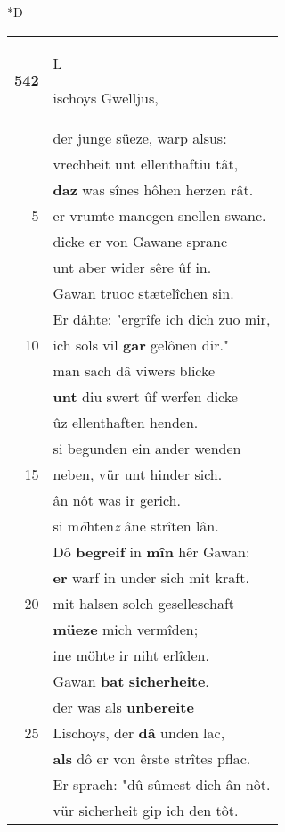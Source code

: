 \documentclass[8pt,a4paper,notitlepage]{article}
\begin{document}
\begin{table}[ht]
\begin{minipage}[t]{0.5\linewidth}
\small
\begin{center}*D
\end{center}
\begin{tabular}{rl}
\textbf{542} & \begin{large}L\end{large}ischoys Gwelljus,\\ 
 & der junge süeze, warp alsus:\\ 
 & vrechheit unt ellenthaftiu tât,\\ 
 & \textbf{daz} was sînes hôhen herzen rât.\\ 
5 & er vrumte manegen snellen swanc.\\ 
 & dicke er von Gawane spranc\\ 
 & unt aber wider sêre ûf in.\\ 
 & Gawan truoc stætelîchen sin.\\ 
 & Er dâhte: "ergrîfe ich dich zuo mir,\\ 
10 & ich sols vil \textbf{gar} gelônen dir."\\ 
 & man sach dâ viwers blicke\\ 
 & \textbf{unt} diu swert ûf werfen dicke\\ 
 & ûz ellenthaften henden.\\ 
 & si begunden ein ander wenden\\ 
15 & neben, vür unt hinder sich.\\ 
 & ân nôt was ir gerich.\\ 
 & si m\textit{ö}hten\textit{z} âne strîten lân.\\ 
 & Dô \textbf{begreif} in \textbf{mîn} hêr Gawan:\\ 
 & \textbf{er} warf in under sich mit kraft.\\ 
20 & mit halsen solch geselleschaft\\ 
 & \textbf{müeze} mich vermîden;\\ 
 & ine möhte ir niht erlîden.\\ 
 & Gawan \textbf{bat} \textbf{sicherheite}.\\ 
 & der was als \textbf{unbereite}\\ 
25 & Lischoys, der \textbf{dâ} unden lac,\\ 
 & \textbf{als} dô er von êrste strîtes pflac.\\ 
 & Er sprach: "dû sûmest dich ân nôt.\\ 
 & vür sicherheit gip ich den tôt.\\ 

\end{tabular}
\end{minipage}
\end{table}
\end{document}
